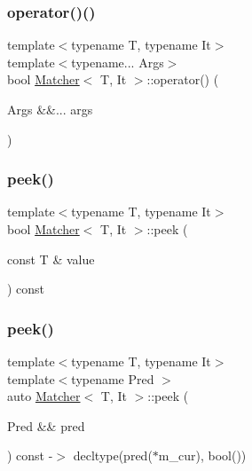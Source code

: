\mbox{\label{class_matcher_a2c1cbd69f6fcbbcf40e9e66333cfddca}} 
\subsubsection{\texorpdfstring{operator()()}{operator()()}}
{\footnotesize\ttfamily template$<$typename T, typename It$>$ \\
template$<$typename... Args$>$ \\
bool \hyperlink{class_matcher}{Matcher}$<$ T, It $>$\+::operator() (\begin{DoxyParamCaption}\item[{Args \&\&...}]{args }\end{DoxyParamCaption})\hspace{0.3cm}{\ttfamily [inline]}}

\mbox{\label{class_matcher_a28b154cbc4cb7ae203810043e069ae38}} 
\subsubsection{\texorpdfstring{peek()}{peek()}\hspace{0.1cm}{\footnotesize\ttfamily [1/2]}}
{\footnotesize\ttfamily template$<$typename T, typename It$>$ \\
bool \hyperlink{class_matcher}{Matcher}$<$ T, It $>$\+::peek (\begin{DoxyParamCaption}\item[{const T \&}]{value }\end{DoxyParamCaption}) const\hspace{0.3cm}{\ttfamily [inline]}}

\mbox{\label{class_matcher_a4c92e3958c64eee29812f4ed75c331cf}} 
\subsubsection{\texorpdfstring{peek()}{peek()}\hspace{0.1cm}{\footnotesize\ttfamily [2/2]}}
{\footnotesize\ttfamily template$<$typename T, typename It$>$ \\
template$<$typename Pred $>$ \\
auto \hyperlink{class_matcher}{Matcher}$<$ T, It $>$\+::peek (\begin{DoxyParamCaption}\item[{Pred \&\&}]{pred }\end{DoxyParamCaption}) const -\/$>$ decltype(pred($\ast$m\+\_\+cur), bool())
  \hspace{0.3cm}{\ttfamily [inline]}}

